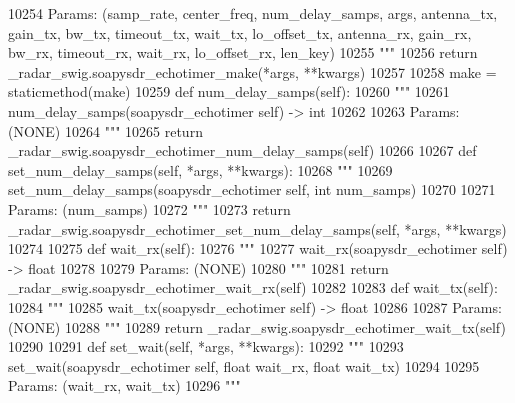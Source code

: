 \begin{DoxyCode}
{{{{{{{{{{{{{{{{{{{{{{{{{{{{{{{{{10254 \textcolor{stringliteral}{        Params: (samp\_rate, center\_freq, num\_delay\_samps, args, antenna\_tx, gain\_tx, bw\_tx, timeout\_tx,
       wait\_tx, lo\_offset\_tx, antenna\_rx, gain\_rx, bw\_rx, timeout\_rx, wait\_rx, lo\_offset\_rx, len\_key)}
10255 \textcolor{stringliteral}{        """}
10256         \textcolor{keywordflow}{return} \_radar\_swig.soapysdr\_echotimer\_make(*args, **kwargs)
10257 
10258     make = staticmethod(make)
10259     \textcolor{keyword}{def }num_delay_samps(self):
10260         \textcolor{stringliteral}{"""}
10261 \textcolor{stringliteral}{        num\_delay\_samps(soapysdr\_echotimer self) -> int}
10262 \textcolor{stringliteral}{}
10263 \textcolor{stringliteral}{        Params: (NONE)}
10264 \textcolor{stringliteral}{        """}
10265         \textcolor{keywordflow}{return} \_radar\_swig.soapysdr\_echotimer\_num\_delay\_samps(self)
10266 
10267     \textcolor{keyword}{def }set_num_delay_samps(self, *args, **kwargs):
10268         \textcolor{stringliteral}{"""}
10269 \textcolor{stringliteral}{        set\_num\_delay\_samps(soapysdr\_echotimer self, int num\_samps)}
10270 \textcolor{stringliteral}{}
10271 \textcolor{stringliteral}{        Params: (num\_samps)}
10272 \textcolor{stringliteral}{        """}
10273         \textcolor{keywordflow}{return} \_radar\_swig.soapysdr\_echotimer\_set\_num\_delay\_samps(self, *args, **kwargs)
10274 
10275     \textcolor{keyword}{def }wait_rx(self):
10276         \textcolor{stringliteral}{"""}
10277 \textcolor{stringliteral}{        wait\_rx(soapysdr\_echotimer self) -> float}
10278 \textcolor{stringliteral}{}
10279 \textcolor{stringliteral}{        Params: (NONE)}
10280 \textcolor{stringliteral}{        """}
10281         \textcolor{keywordflow}{return} \_radar\_swig.soapysdr\_echotimer\_wait\_rx(self)
10282 
10283     \textcolor{keyword}{def }wait_tx(self):
10284         \textcolor{stringliteral}{"""}
10285 \textcolor{stringliteral}{        wait\_tx(soapysdr\_echotimer self) -> float}
10286 \textcolor{stringliteral}{}
10287 \textcolor{stringliteral}{        Params: (NONE)}
10288 \textcolor{stringliteral}{        """}
10289         \textcolor{keywordflow}{return} \_radar\_swig.soapysdr\_echotimer\_wait\_tx(self)
10290 
10291     \textcolor{keyword}{def }set_wait(self, *args, **kwargs):
10292         \textcolor{stringliteral}{"""}
10293 \textcolor{stringliteral}{        set\_wait(soapysdr\_echotimer self, float wait\_rx, float wait\_tx)}
10294 \textcolor{stringliteral}{}
10295 \textcolor{stringliteral}{        Params: (wait\_rx, wait\_tx)}
10296 \textcolor{stringliteral}{        """}
}}}}}}}}}}}}}}}}}}}}}}}}}}}}}}}}}
\end{DoxyCode}
